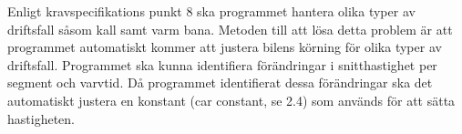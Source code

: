 Enligt kravspecifikations punkt 8 ska programmet hantera olika typer av driftsfall såsom kall samt varm bana.
Metoden till att lösa detta problem är att programmet automatiskt kommer att justera bilens körning för olika typer av driftsfall. Programmet ska kunna identifiera förändringar i snitthastighet per segment och varvtid. Då programmet identifierat dessa förändringar ska det automatiskt justera en konstant (car constant, se 2.4) som används för att sätta hastigheten.